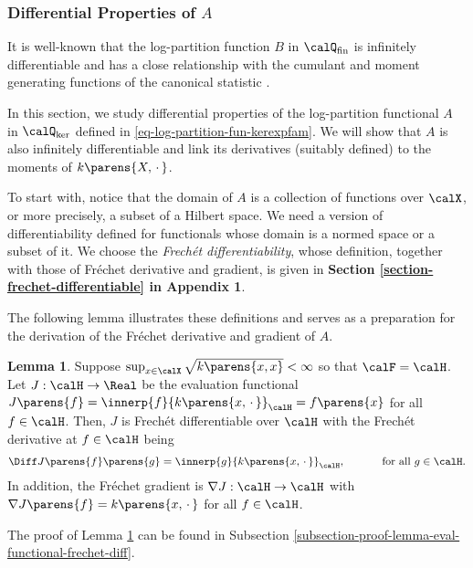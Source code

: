 \documentclass[12pt]{article}
\theoremstyle{definition}
\theoremstyle{theorem}
\newtheorem{lemma}{Lemma}
\theoremstyle{remark}
\begin{document}
\subsubsection{Differential Properties of $A$}

It is well-known that the log-partition function $B$ in $\calQ_{\mathrm{fin}}$ is infinitely differentiable and has a close relationship with the cumulant and moment generating functions of the canonical statistic \parencites[Theorem 2.2 in][]{Brown1986-ef}. 

In this section, we study differential properties of the log-partition functional $A$ in $\calQ_{\ker}$ defined in \eqref{eq-log-partition-fun-kerexpfam}. We will show that $A$ is also infinitely differentiable and link its derivatives (suitably defined) to the moments of $k \parens{X, \,\cdot\,}$. 

To start with, notice that the domain of $A$ is a collection of functions over $\calX$, or more precisely, a subset of a Hilbert space. We need a version of differentiability defined for functionals whose domain is a normed space or a subset of it. We choose the \textit{Frech{\'e}t differentiability}, whose definition, together with those of Fr{\'e}chet derivative and gradient, is given in \textbf{\color{red} Section \ref{section-frechet-differentiable} in Appendix 1}. 

The following lemma illustrates these definitions and serves as a preparation for the derivation of the Fr{\'e}chet derivative and gradient of $A$. 

\begin{lemma}\label{lemma-eval-functional-frechet-diff}
	Suppose $\sup_{x \in \calX} \sqrt{k \parens{x, x}} < \infty$ so that $\calF = \calH$. Let $J: \calH \to \Real$ be the evaluation functional $J \parens{f} = \innerp{f}{k \parens{x, \,\cdot\,}}_{\calH} = f \parens{x}$ for all $f \in \calH$. Then, $J$ is Frech{\'e}t differentiable over $\calH$ with the Frech{\'e}t derivative at $f \in \calH$ being 
	\begin{align*}
		\Diff J \parens{f} \parens{g} = \innerp{g}{k \parens{x, \,\cdot\,}}_{\calH}, \quad \qquad \text{ for all } g \in \calH. 
	\end{align*}
	In addition, the Fr{\'e}chet gradient is $\nabla J: \calH \to \calH$ with $\nabla J \parens{f} = k \parens{x, \,\cdot\,}$ for all $f \in \calH$. 
\end{lemma}

The proof of Lemma \ref{lemma-eval-functional-frechet-diff} can be found in Subsection \ref{subsection-proof-lemma-eval-functional-frechet-diff}. 
\end{document}
